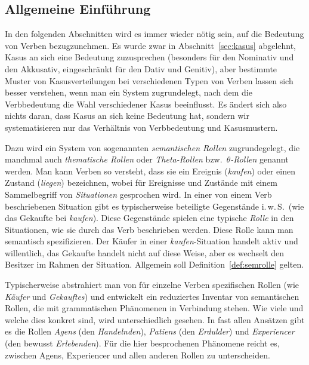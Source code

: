 \subsection{Allgemeine Einführung}

In den folgenden Abschnitten wird es immer wieder nötig sein, auf die Bedeutung von Verben bezugzunehmen.
Es wurde zwar in Abschnitt~\ref{sec:kasus} abgelehnt, Kasus an sich eine Bedeutung zuzusprechen (besonders für den Nominativ und den Akkusativ, eingeschränkt für den Dativ und Genitiv), aber bestimmte Muster von Kasusverteilungen bei verschiedenen Typen von Verben lassen sich besser verstehen, wenn man ein System zugrundelegt, nach dem die Verbbedeutung die Wahl verschiedener Kasus beeinflusst.
Es ändert sich also nichts daran, dass Kasus an sich keine Bedeutung hat, sondern wir systematisieren nur das Verhältnis von Verbbedeutung und Kasusmustern.

Dazu wird ein System von sogenannten \textit{semantischen Rollen} zugrundegelegt, die manchmal auch \textit{thematische Rollen} oder \textit{Theta-Rollen} bzw.\ $\theta$\textit{-Rollen} genannt werden.
Man kann Verben so versteht, dass sie ein Ereignis (\zB \textit{kaufen}) oder einen Zustand (\zB \textit{liegen}) bezeichnen, wobei für Ereignisse und Zustände mit einem Sammelbegriff von \textit{Situationen} gesprochen wird.
In einer von einem Verb beschriebenen Situation gibt es typischerweise beteiligte Gegenstände i.\,w.\,S.\ (wie das Gekaufte bei \textit{kaufen}).
Diese Gegenstände spielen eine typische \textit{Rolle} in den Situationen, wie sie durch das Verb beschrieben werden.
Diese Rolle kann man semantisch spezifizieren.
Der Käufer in einer \textit{kaufen}-Situation handelt \zB aktiv und willentlich, das Gekaufte handelt nicht auf diese Weise, aber es wechselt den Besitzer im Rahmen der Situation.
Allgemein soll Definition~\ref{def:semrolle} gelten.


Typischerweise abstrahiert man von für einzelne Verben spezifischen Rollen (wie \textit{Käufer} und \textit{Gekauftes}) und entwickelt ein reduziertes Inventar von semantischen Rollen, die mit grammatischen Phänomenen in Verbindung stehen.
Wie viele und welche dies konkret sind, wird unterschiedlich gesehen.
In fast allen Ansätzen gibt es die Rollen \textit{Agens} (den \textit{Handelnden}), \textit{Patiens} (den \textit{Erdulder}) und \textit{Experiencer} (den bewusst \textit{Erlebenden}).
Für die hier besprochenen Phänomene reicht es, zwischen Agens, Experiencer und allen anderen Rollen zu unterscheiden.

